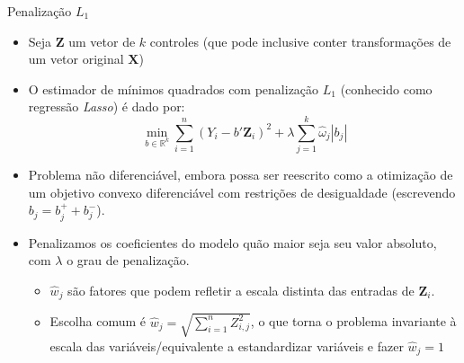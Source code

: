 \documentclass[11pt]{beamer}
\begin{document}
\begin{frame}{Penalização $L_1$}
\begin{itemize}
	\item Seja $\boldsymbol{Z}$ um vetor de $k$ controles (que pode inclusive conter transformações de um vetor original $\boldsymbol{X}$)
	
	\item O estimador de mínimos quadrados com penalização $L_1$ ({\color{blue}conhecido como regressão \textit{Lasso}}) é dado por:
	$$\min_{b \in \mathbb{R}^k}\sum_{i=1}^n (Y_i-b'\boldsymbol{Z}_i)^2 + \lambda \sum_{j=1}^k \hat \omega_j |b_j| $$
	
	\item Problema não diferenciável, embora possa ser reescrito como a otimização de um objetivo convexo diferenciável com restrições de desigualdade (escrevendo $b_j = b_j^+ + b_j^-$).
	\item Penalizamos os coeficientes do modelo quão maior seja seu valor absoluto, com $\lambda$ o grau de penalização. 
	\begin{itemize}
		\item $\hat{w}_j$ são fatores que podem refletir a escala distinta das entradas de $\boldsymbol{Z}_i$.
		\item Escolha comum é $\hat{w}_j = \sqrt{\sum_{i=1}^n Z_{i,j}^2}$, o que torna o problema invariante à escala das variáveis/equivalente a estandardizar variáveis e fazer $\hat{w}_j=1$
	\end{itemize}
\end{itemize}
\end{frame}
\end{document}

